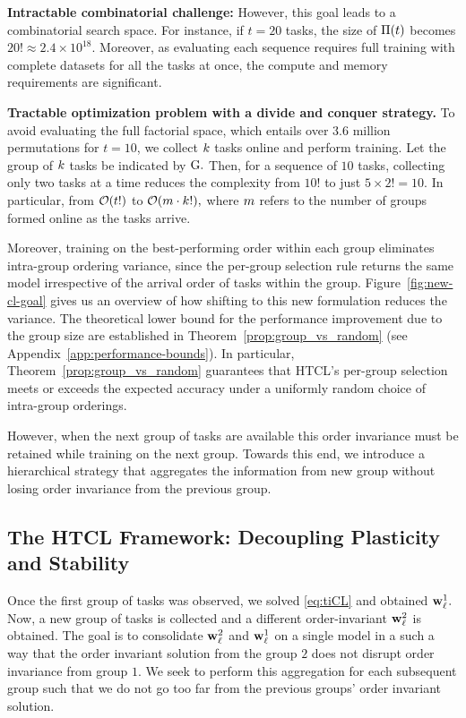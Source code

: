 \textbf{Intractable combinatorial challenge:}  However, this goal leads to a combinatorial search space. For instance, if $t=20$ tasks, the size of $\Pi(t)$ becomes $20! \approx 2.4 \times 10^{18}$. Moreover, as evaluating each sequence requires full training with complete datasets for all the tasks at once, the compute and memory requirements are significant.

\textbf{Tractable optimization problem with a divide and conquer strategy.} To avoid evaluating the full factorial space, which entails over $3.6$ million permutations for $t=10$, we collect $k$ tasks online and perform training. Let the group of $k$ tasks be indicated by $\mathrm{G}.$ Then, for a sequence of $10$ tasks, collecting only two tasks at a time reduces the complexity from $10!$  to just $5 \times 2! = 10.$  In particular, from $\mathcal{O}(t!)$ to $\mathcal{O}(m \cdot k!),$ where $m$ refers to the number of groups formed online as the tasks arrive. 

Moreover, training on the best-performing order within each group eliminates intra-group ordering variance, since the per-group selection rule returns the same model irrespective of the arrival order of tasks within the group. Figure~\ref{fig:new-cl-goal} gives us an overview of how shifting to this new formulation reduces the variance. The theoretical lower bound for the performance improvement due to the group size are established in Theorem~\ref{prop:group_vs_random} (see Appendix~\ref{app:performance-bounds}). In particular, Theorem~\ref{prop:group_vs_random} guarantees that HTCL's per-group selection meets or exceeds the expected accuracy under a uniformly random choice of intra-group orderings. %

However, when the next group of tasks are available this order invariance must be retained while training on the next group. Towards this end, we introduce a hierarchical strategy that aggregates the information from new group without losing order invariance from the previous group. 

\subsection{The HTCL Framework: Decoupling Plasticity and Stability}
\label{sec:htcl_framework}

Once the first group of tasks was observed, we solved \eqref{eq:tiCL}  and obtained $\mathbf{w}_{\ell}^{1}.$ Now, a new group of tasks is collected and a different order-invariant $\mathbf{w}_{\ell}^{2}$ is obtained. The goal is to consolidate $\mathbf{w}_{\ell}^{2}$ and $\mathbf{w}_{\ell}^{1}$ on a single model in a such a way that the order invariant solution from the group $2$ does not disrupt order invariance from group $1$. We seek to perform this aggregation for each subsequent group such that we do not go too far from the previous groups' order invariant solution. 

